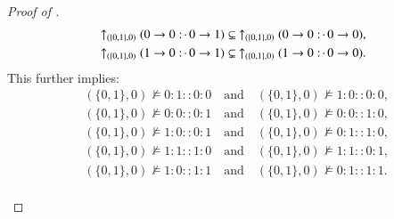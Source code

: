 \documentclass[11pt]{amsart}
\theoremstyle{definition} %
\newcommand{\righttherefore}{:\joinrel\cdot\,}
\begin{document}
\begin{proof}[Proof of ]
\begin{align*}
	&\uparrow_{(\{0,1\},0)}(0\to 0\righttherefore 0\to 1)\subsetneq\ \uparrow_{(\{0,1\},0)}(0\to 0\righttherefore 0\to 0),\\
	&\uparrow_{(\{0,1\},0)}(1\to 0\righttherefore 0\to 1)\subsetneq\ \uparrow_{(\{0,1\},0)}(1\to 0\righttherefore 0\to 0).
\end{align*} This further implies:
\begin{align} 
	\label{equ:B0_notmodels_0100_1000} &(\{0,1\},0)\not\models 0:1::0:0 \quad\text{and}\quad (\{0,1\},0)\not\models 1:0::0:0,\\
	\label{equ:B0_notmodels_0001_0010} &(\{0,1\},0)\not\models 0:0::0:1 \quad\text{and}\quad (\{0,1\},0)\not\models 0:0::1:0,\\
	\label{equ:B0_notmodels_1001_0110} &(\{0,1\},0)\not\models 1:0::0:1 \quad\text{and}\quad (\{0,1\},0)\not\models 0:1::1:0,\\
	\label{equ:B0_notmodels_1110_1101} &(\{0,1\},0)\not\models 1:1::1:0 \quad\text{and}\quad (\{0,1\},0)\not\models 1:1::0:1,\\ 
	\label{equ:B0_notmodels_1011_0111} &(\{0,1\},0)\not\models 1:0::1:1 \quad\text{and}\quad (\{0,1\},0)\not\models 0:1::1:1.
\end{align}\\


\end{proof}
\end{document}
